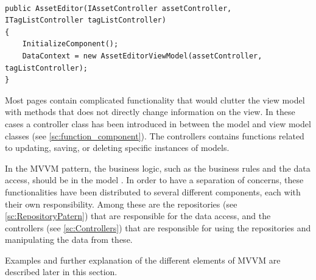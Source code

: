 \begin{listing}[H]
\begin{verbatim}

public AssetEditor(IAssetController assetController, ITagListController tagListController)
{
    InitializeComponent();
    DataContext = new AssetEditorViewModel(assetController, tagListController);
}

\end{verbatim}
\label{code:AssetEditorView}
\end{listing}

Most pages contain complicated functionality that would clutter the view model with methods that does not directly change information on the view. In these cases a controller class has been introduced in between the model and view model classes (see \autoref{sc:function_component}). The controllers contains functions related to updating, saving, or deleting specific instances of models. 
\par
In the MVVM pattern, the business logic, such as the business rules and the data access, should be in the model \citep{MvvmBasics}. In order to have a separation of concerns, these functionalities have been distributed to several different components, each with their own responsibility. Among these are the repositories (see \autoref{sc:RepositoryPatern}) that are responsible for the data access, and the controllers (see \autoref{sc:Controllers}) that are responsible for using the repositories and manipulating the data from these.
\par
Examples and further explanation of the different elements of MVVM are described later in this section.



